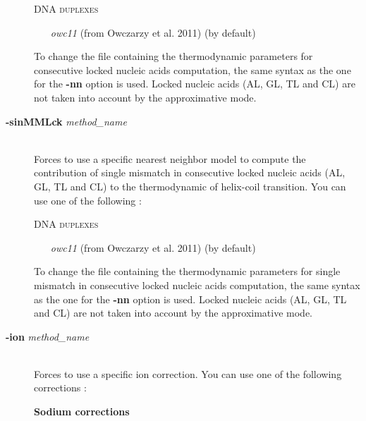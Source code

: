 \documentclass{article}
\begin{document}
\begin{description}
  \textsc{DNA duplexes}
    \begin{itemize}
    \item [\textit{owc11}] (from Owczarzy et al. 2011) (by default)
    \end{itemize}
  To change the file containing the thermodynamic parameters for consecutive locked nucleic acids computation, the same syntax as the one for the \textbf{-nn} option is used.
  Locked nucleic acids (AL, GL, TL and CL) are not taken into account by the approximative mode.
  \item [\textbf{-sinMMLck} \textit{method\_name}]\mbox{}\\ 
  Forces to use a specific nearest neighbor model to compute the contribution of single mismatch in consecutive locked nucleic acids (AL, GL, TL and CL) to the thermodynamic 
  of helix-coil transition. 
  You can use one of the following :
  
  \textsc{DNA duplexes}
    \begin{itemize}
    \item [\textit{owc11}] (from Owczarzy et al. 2011) (by default)
    \end{itemize}
  To change the file containing the thermodynamic parameters for single mismatch in consecutive locked nucleic acids computation, the same syntax as the one for the \textbf{-nn} option is used.
  Locked nucleic acids (AL, GL, TL and CL) are not taken into account by the approximative mode.
\item [\textbf{-ion} \textit{method\_name}]\mbox{}\\ 
  Forces to use a specific ion correction. You can use one of the following corrections : 
    
    \textbf{Sodium corrections}
    

\end{description}
\end{document}
